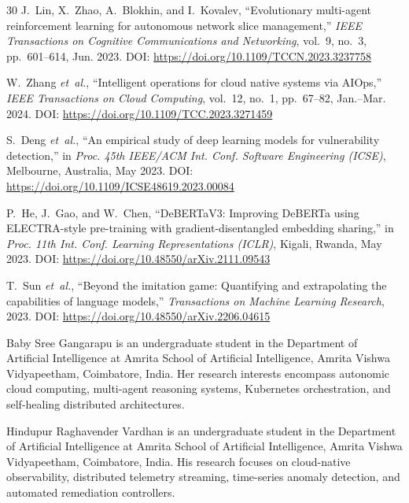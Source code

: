 \documentclass[journal,10pt,twoside]{IEEEtran}
\begin{document}
\begin{thebibliography}{30}
J.~Lin, X.~Zhao, A.~Blokhin, and I.~Kovalev,
``Evolutionary multi-agent reinforcement learning for autonomous
network slice management,''
\textit{IEEE Transactions on Cognitive Communications and Networking},
vol.~9, no.~3, pp.~601--614, Jun. 2023.
\newblock DOI: \url{https://doi.org/10.1109/TCCN.2023.3237758}

W.~Zhang \textit{et~al.},
``Intelligent operations for cloud native systems via AIOps,''
\textit{IEEE Transactions on Cloud Computing}, vol.~12, no.~1,
pp.~67--82, Jan.--Mar. 2024.
\newblock DOI: \url{https://doi.org/10.1109/TCC.2023.3271459}

S.~Deng \textit{et~al.},
``An empirical study of deep learning models for vulnerability detection,''
in \textit{Proc. 45th IEEE/ACM Int. Conf. Software Engineering (ICSE)},
Melbourne, Australia, May 2023.
\newblock DOI: \url{https://doi.org/10.1109/ICSE48619.2023.00084}

P.~He, J.~Gao, and W.~Chen,
``DeBERTaV3: Improving DeBERTa using ELECTRA-style pre-training with
gradient-disentangled embedding sharing,''
in \textit{Proc. 11th Int. Conf. Learning Representations (ICLR)},
Kigali, Rwanda, May 2023.
\newblock DOI: \url{https://doi.org/10.48550/arXiv.2111.09543}

T.~Sun \textit{et~al.},
``Beyond the imitation game: Quantifying and extrapolating the capabilities
of language models,''
\textit{Transactions on Machine Learning Research}, 2023.
\newblock DOI: \url{https://doi.org/10.48550/arXiv.2206.04615}

\end{thebibliography}

\begin{IEEEbiographynophoto}{Baby Sree Gangarapu}
is an undergraduate student in the Department of Artificial Intelligence at Amrita School of Artificial Intelligence, Amrita Vishwa Vidyapeetham, Coimbatore, India. Her research interests encompass autonomic cloud computing, multi-agent reasoning systems, Kubernetes orchestration, and self-healing distributed architectures.
\end{IEEEbiographynophoto}

\begin{IEEEbiographynophoto}{Hindupur Raghavender Vardhan}
is an undergraduate student in the Department of Artificial Intelligence at Amrita School of Artificial Intelligence, Amrita Vishwa Vidyapeetham, Coimbatore, India. His research focuses on cloud-native observability, distributed telemetry streaming, time-series anomaly detection, and automated remediation controllers.
\end{IEEEbiographynophoto}
\end{document}
